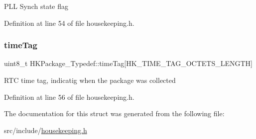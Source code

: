 P\+LL Synch state flag 

Definition at line 54 of file housekeeping.\+h.

\mbox{\label{struct_h_k_package___typedef_a5fee9934ab767f6c0c2ee480c6001a28}} 
\subsubsection{\texorpdfstring{time\+Tag}{timeTag}}
{\footnotesize\ttfamily uint8\+\_\+t H\+K\+Package\+\_\+\+Typedef\+::time\+Tag\mbox{[}H\+K\+\_\+\+T\+I\+M\+E\+\_\+\+T\+A\+G\+\_\+\+O\+C\+T\+E\+T\+S\+\_\+\+L\+E\+N\+G\+TH\mbox{]}}

R\+TC time tag, indicatig when the package was collected 

Definition at line 56 of file housekeeping.\+h.



The documentation for this struct was generated from the following file\+:\begin{DoxyCompactItemize}
\item 
src/include/\hyperlink{housekeeping_8h}{housekeeping.\+h}\end{DoxyCompactItemize}
